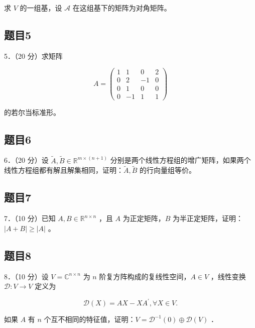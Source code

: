 \documentclass{article}
\begin{document}
求 \(V\) 的一组基，设 \(\mathcal{A}\) 在这组基下的矩阵为对角矩阵。

\subsection{题目5}
5．（20 分）求矩阵

\[
A=\left(\begin{array}{cccc}
1 & 1 & 0 & 2 \\
0 & 2 & -1 & 0 \\
0 & 1 & 0 & 0 \\
0 & -1 & 1 & 1
\end{array}\right)
\]

的若尔当标准形。

\subsection{题目6}
6．（20 分）设 \(\widetilde{A}, \widetilde{B} \in \mathbb{R}^{m \times(n+1)}\) 分别是两个线性方程组的增广矩阵，如果两个线性方程组都有解且解集相同，证明：\(\widetilde{A}, \widetilde{B}\) 的行向量组等价。

\subsection{题目7}
7．（10 分）已知 \(A, B \in \mathbb{R}^{n \times n}\) ，且 \(A\) 为正定矩阵，\(B\) 为半正定矩阵，证明：\(|A+B| \geq|A|\) 。

\subsection{题目8}
8．（10 分）设 \(V=\mathbb{C}^{n \times n}\) 为 \(n\) 阶复方阵构成的复线性空间，\(A \in V\) ，线性变换 \(\mathcal{D}: V \rightarrow V\) 定义为

\[
\mathcal{D}(X)=A X-X A^{\prime}, \forall X \in V .
\]

如果 \(A\) 有 \(n\) 个互不相同的特征值，证明：\(V=\mathcal{D}^{-1}(0) \oplus \mathcal{D}(V)\) ．
\end{document}
